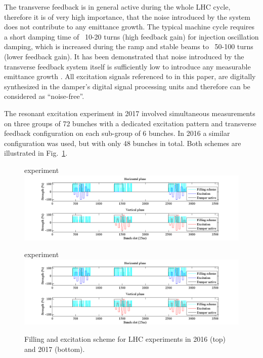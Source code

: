 \documentclass[%
 reprint,
 amsmath,amssymb,
 aps,
prstab,
]{revtex4-1}
\begin{document}
The transverse feedback is in general active during the whole LHC cycle, therefore it is of very high importance, that the noise introduced by the system does not contribute to any emittance growth. The typical machine cycle requires a short damping time of ~10-20 turns (high feedback gain) for injection oscillation damping, which is increased during the ramp and stable beams to ~50-100 turns (lower feedback gain). It has been demonstrated that noise introduced by the transverse feedback system itself is sufficiently low to introduce any measurable emittance growth \cite{adt_noise_emit_2017}. All excitation signals referenced to in this paper, are digitally synthesized in the damper's digital signal processing units and therefore can be considered as ``noise-free''.

The resonant excitation experiment in 2017 involved simultaneous measurements on three groups of 72 bunches with a dedicated excitation pattern and transverse feedback configuration on each sub-group of 6 bunches. In 2016 a similar configuration was used, but with only 48 bunches in total. Both schemes are illustrated in Fig.~\ref{fig:fill}.
\begin{figure}
	\begin{minipage}[t]{1.0\linewidth}
		 experiment
		\includegraphics[width=1.0\linewidth]{bunchfilling.png}	
	\end{minipage}
	\begin{minipage}[t]{1.0\linewidth}
	 experiment
	\includegraphics[width=1.0\linewidth]{bunchfilling.png}	
	\end{minipage}
	\caption{\label{fig:fill} Filling and excitation scheme for LHC experiments in 2016 (top) and 2017 (bottom).}
\end{figure}
\end{document}

